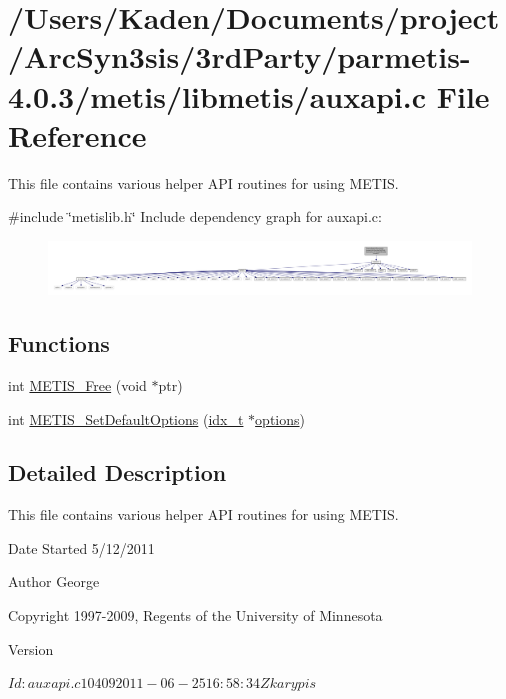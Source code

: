 \hypertarget{a00170}{}\section{/\+Users/\+Kaden/\+Documents/project/\+Arc\+Syn3sis/3rd\+Party/parmetis-\/4.0.3/metis/libmetis/auxapi.c File Reference}
\label{a00170}


This file contains various helper A\+PI routines for using M\+E\+T\+IS.  


{\ttfamily \#include \char`\"{}metislib.\+h\char`\"{}}\newline
Include dependency graph for auxapi.\+c\+:\nopagebreak
\begin{figure}[H]
\begin{center}
\leavevmode
\includegraphics[width=350pt]{a00171}
\end{center}
\end{figure}
\subsection*{Functions}
\begin{DoxyCompactItemize}
\item 
int \hyperlink{a00170_a8b3f46b67d6ec9fccaa8c72b9ad10b71}{M\+E\+T\+I\+S\+\_\+\+Free} (void $\ast$ptr)
\item 
int \hyperlink{a00170_abea67bb0c6286795ac5fc9bee605dc5d}{M\+E\+T\+I\+S\+\_\+\+Set\+Default\+Options} (\hyperlink{a00876_aaa5262be3e700770163401acb0150f52}{idx\+\_\+t} $\ast$\hyperlink{a00879_a68c032ed4161802775c6847d4cb39adf}{options})
\end{DoxyCompactItemize}


\subsection{Detailed Description}
This file contains various helper A\+PI routines for using M\+E\+T\+IS. 

\begin{DoxyDate}{Date}
Started 5/12/2011 
\end{DoxyDate}
\begin{DoxyAuthor}{Author}
George 

Copyright 1997-\/2009, Regents of the University of Minnesota 
\end{DoxyAuthor}
\begin{DoxyVersion}{Version}
\begin{DoxyVerb}$Id: auxapi.c 10409 2011-06-25 16:58:34Z karypis $ \end{DoxyVerb}
 
\end{DoxyVersion}


